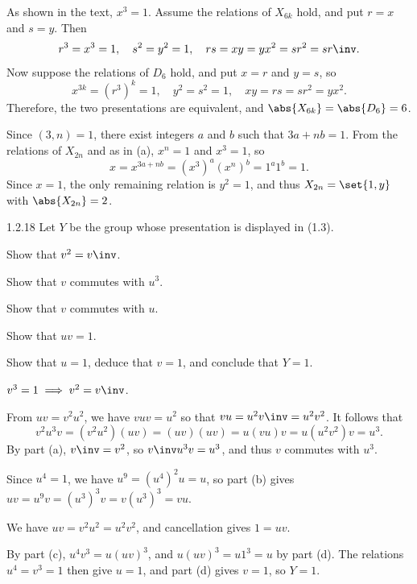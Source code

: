 \begin{solenum}
    \item As shown in the text, $x^3 = 1$.
	Assume the relations of $X_{6k}$ hold, and put $r = x$ and $s = y$.
    Then
    \[
        r^3 = x^3 = 1, \quad s^2 = y^2 = 1, \quad rs = xy = yx^2 = sr^2 = sr\inv.
    \]
    Now suppose the relations of $D_6$ hold, and put $x = r$ and $y = s$, so
    \[
        x^{3k} = (r^3)^k = 1, \quad y^2 = s^2 = 1, \quad xy = rs = sr^2 = yx^2.
    \]
    Therefore, the two presentations are equivalent, and $\abs{X_{6k}} = \abs{D_6} = 6$.
    \item Since $(3, n) = 1$, there exist integers $a$ and $b$ such that $3a + nb = 1$.
	From the relations of $X_{2n}$ and as in (a), $x^n = 1$ and $x^3 = 1$, so
    \[
    	x = x^{3a + nb} = (x^3)^a (x^n)^b = 1^a 1^b = 1.
    \]
    Since $x = 1$, the only remaining relation is $y^2 = 1$, and thus $X_{2n} = \set{1, y}$ with $\abs{X_{2n}} = 2$.
\end{solenum}

\begin{exercise}{1.2.18}
    Let $Y$ be the group whose presentation is displayed in (1.3).
    \begin{subexercises}
        \item Show that $v^2 = v\inv$.
        \item Show that $v$ commutes with $u^3$.
        \item Show that $v$ commutes with $u$.
        \item Show that $uv = 1$.
        \item Show that $u = 1$, deduce that $v = 1$, and conclude that $Y = 1$.
    \end{subexercises}
\end{exercise}

\begin{solenum}
    \item $v^3 = 1 \implies v^2 = v\inv$.
    \item From $uv = v^2u^2$, we have $vuv = u^2$ so that $vu = u^2v\inv = u^2v^2$.
    It follows that
    \[
        v^2u^3v = (v^2u^2)(uv) = (uv)(uv) = u(vu)v = u(u^2v^2)v = u^3.
    \]
    By part (a), $v\inv = v^2$, so $v\inv u^3 v = u^3$, and thus $v$ commutes with $u^3$.
    \item Since $u^4 = 1$, we have $u^9 = (u^4)^2u = u$, so part (b) gives $uv = u^9v = (u^3)^3v = v(u^3)^3 = vu$.
    \item We have $uv = v^2u^2 = u^2v^2$, and cancellation gives $1 = uv$.
    \item By part (c), $u^4v^3 = u(uv)^3$, and $u(uv)^3 = u1^3 = u$ by part (d). 
    The relations $u^4 = v^3 = 1$ then give $u = 1$, and part (d) gives $v = 1$, so $Y = 1$.
\end{solenum}